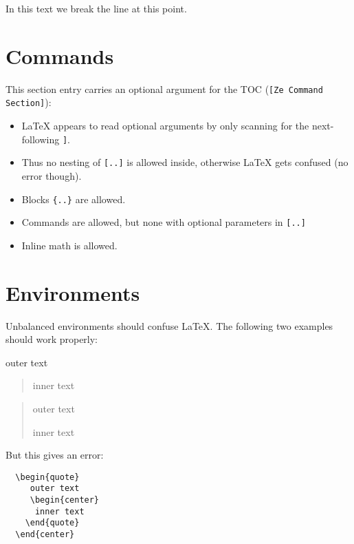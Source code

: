 \documentclass[a4paper]{article}
\begin{document}
\noindent
In this text we break the line\break
at this point.


\newcommand{\foo}[2][default]{Mandatory: #2; optional: #1}

\section[Ze Command Section]{Commands}

This section entry carries an optional argument for the TOC (\verb![Ze Command Section]!):
\begin{itemize}
\item
LaTeX appears to read optional arguments by only scanning for the next-following \verb!]!.
\item
Thus no nesting of \verb![..]! is allowed inside, otherwise LaTeX gets confused (no error though).
\item
Blocks \verb!{..}! are allowed.
\item
Commands are allowed, but none with optional parameters in \verb![..]!
\item
Inline math is allowed.
\end{itemize}



\section{Environments}

Unbalanced environments should confuse LaTeX. The following two examples should work properly:

\begin{center}
outer text
\begin{quote}
inner text
\end{quote}
\end{center}


\begin{quote}
outer text
\begin{center}
inner text
\end{center}
\end{quote}

But this gives an error:
\begin{verbatim}
  \begin{quote}
     outer text
     \begin{center}
      inner text
    \end{quote}
  \end{center}
\end{verbatim}
\end{document}
